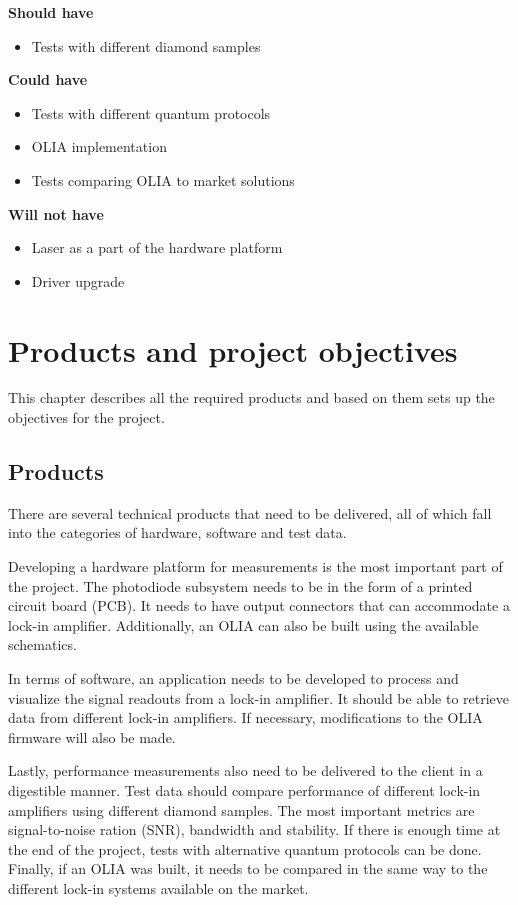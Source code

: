 \documentclass{report}
\begin{document}
	\textbf{Should have}
	\begin{itemize}
		\item Tests with different diamond samples
	\end{itemize}
	
	\textbf{Could have}
	\begin{itemize}
		\item Tests with different quantum protocols
		\item OLIA implementation
		\item Tests comparing OLIA to market solutions
	\end{itemize}
	
	\textbf{Will not have}
	\begin{itemize}
		\item Laser as a part of the hardware platform
		\item Driver upgrade
	\end{itemize}
	
	
	\chapter{Products and project objectives}
	This chapter describes all the required products and based on them sets up the objectives for the project.
	
	\section{Products}
	There are several technical products that need to be delivered, all of which fall into the categories of hardware, software and test data.
	
	Developing a hardware platform for measurements is the most important part of the project. The photodiode subsystem needs to be in the form of a printed circuit board (PCB). It needs to have output connectors that can accommodate a lock-in amplifier. Additionally, an OLIA can also be built using the available schematics. 
	
	In terms of software, an application needs to be developed to process and visualize the signal readouts from a lock-in amplifier. It should be able to retrieve data from different lock-in amplifiers. If necessary, modifications to the OLIA firmware will also be made. 
	
	Lastly, performance measurements also need to be delivered to the client in a digestible manner. Test data should compare performance of different lock-in amplifiers using different diamond samples. The most important metrics are signal-to-noise ration (SNR), bandwidth and stability. If there is enough time at the end of the project, tests with alternative quantum protocols can be done. Finally, if an OLIA was built, it needs to be compared in the same way to the different lock-in systems available on the market.
	
\end{document}
